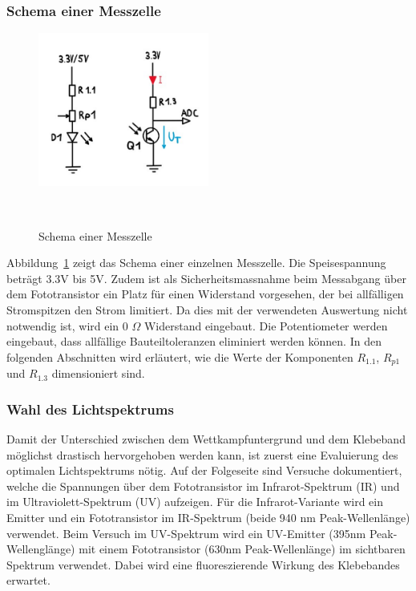 \documentclass[main.tex]{subfiles} %
\begin{document}

\subsubsection*{Schema einer Messzelle}

\begin{figure}[H]
    \centering
    \includegraphics[width=0.5\textwidth]{./fig_Liniensensor/Schema_Messzelle_Liniensensor.pdf}
    \caption{Schema einer Messzelle}~\label{fig:Messzelle}
\end{figure}

Abbildung~\ref{fig:Messzelle} zeigt das Schema einer einzelnen Messzelle. Die
Speisespannung beträgt 3.3V bis 5V. Zudem ist als Sicherheitsmassnahme beim
Messabgang über dem Fototransistor ein Platz für einen Widerstand vorgesehen,
der bei allfälligen Stromspitzen den Strom limitiert. Da dies mit der
verwendeten Auswertung nicht notwendig ist, wird ein 0 $\Omega$ Widerstand
eingebaut. Die Potentiometer werden eingebaut, dass allfällige
Bauteiltoleranzen eliminiert werden können. In den folgenden Abschnitten wird
erläutert, wie die Werte der Komponenten $R_{1.1}$, $R_{p1}$ und $R_{1.3}$
dimensioniert sind.

\subsubsection*{Wahl des Lichtspektrums}
Damit der Unterschied zwischen dem Wettkampfuntergrund und dem Klebeband möglichst
drastisch hervorgehoben werden kann, ist zuerst eine Evaluierung des optimalen
Lichtspektrums nötig. Auf der Folgeseite sind Versuche dokumentiert, welche die Spannungen
über dem Fototransistor im Infrarot-Spektrum (IR) und im Ultraviolett-Spektrum (UV)
aufzeigen. Für die Infrarot-Variante wird ein Emitter und ein Fototransistor im IR-Spektrum (beide 940 nm Peak-Wellenlänge)
verwendet. Beim Versuch im UV-Spektrum wird ein UV-Emitter (395nm Peak-Wellenglänge) mit einem Fototransistor (630nm Peak-Wellenlänge)
im sichtbaren Spektrum verwendet. Dabei wird eine fluoreszierende Wirkung des Klebebandes
erwartet.
\end{document}
